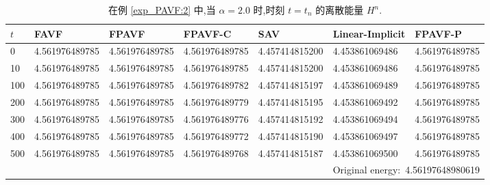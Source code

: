\documentclass[aspectratio=169]{beamer}
\numberwithin{theorem}{section} %
\begin{document}
\begin{frame}%

	\begin{table}[H]\tiny
		\centering
		\caption{在例 \ref{exp_PAVF:2} 中,当 $\alpha=2.0$ 时,时刻 $t=t_n$ 的离散能量 $H^n$.}
	
		  \begin{tabular}{lllllll}
		  \toprule
		   $t$   &FAVF   &FPAVF   &FPAVF-C   &SAV    &Linear-Implicit   &FPAVF-P\\
		  \midrule
		  0     &4.561976489785   &4.561976489785   &4.561976489785   &4.457414815200   &4.453861069486   &4.561976489785 \\
		  10    &4.561976489785   &4.561976489785   &4.561976489785   &4.457414815200   &4.453861069486   &4.561976489785 \\
		  100   &4.561976489785   &4.561976489785   &4.561976489782   &4.457414815197   &4.453861069489   &4.561976489785 \\
		  200   &4.561976489785   &4.561976489785   &4.561976489779   &4.457414815195   &4.453861069492   &4.561976489785 \\
		  300   &4.561976489785   &4.561976489785   &4.561976489776   &4.457414815192   &4.453861069494   &4.561976489785 \\
		  400   &4.561976489785   &4.561976489785   &4.561976489772   &4.457414815190   &4.453861069497   &4.561976489785 \\
		  500   &4.561976489785   &4.561976489785   &4.561976489768   &4.457414815187   &4.453861069500   &4.561976489785 \\
		  \midrule
		  \multicolumn{7}{r}{Original energy:~4.56197648980619} \\
		  \bottomrule
		  \end{tabular}\label{tab_PAVF:1}%
	  \end{table}%
	

\end{frame}
\end{document}
